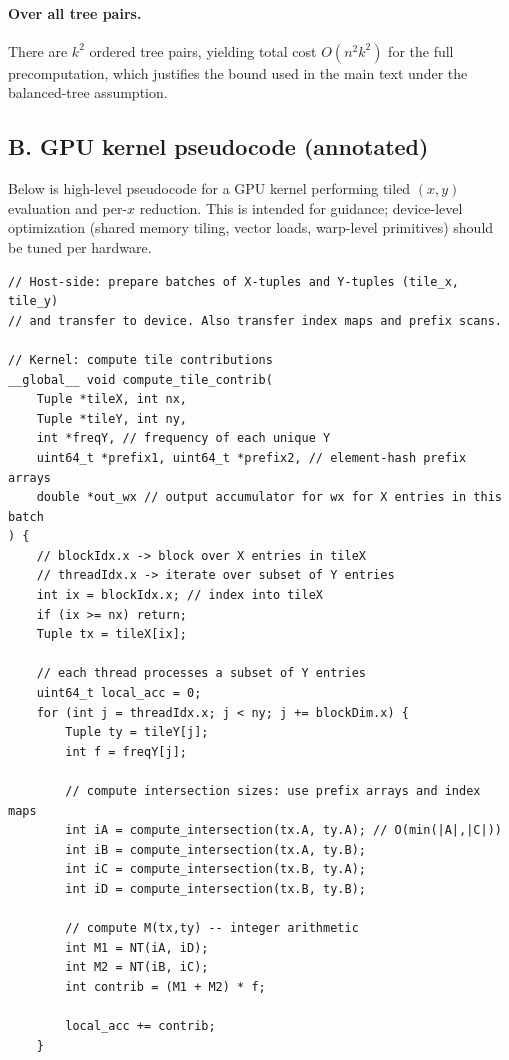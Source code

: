 \documentclass[10pt,a4paper]{article}
\begin{document}
\begin{enumerate}
\paragraph{Over all tree pairs.}
There are $k^2$ ordered tree pairs, yielding total cost $O(n^2 k^2)$ for the full precomputation, which justifies the bound used in the main text under the balanced-tree assumption.

\vspace{4mm}
\subsection*{B. GPU kernel pseudocode (annotated)}

Below is high-level pseudocode for a GPU kernel performing tiled $(x,y)$ evaluation and per-$x$ reduction. This is intended for guidance; device-level optimization (shared memory tiling, vector loads, warp-level primitives) should be tuned per hardware.

\begin{verbatim}
// Host-side: prepare batches of X-tuples and Y-tuples (tile_x, tile_y)
// and transfer to device. Also transfer index maps and prefix scans.

// Kernel: compute tile contributions
__global__ void compute_tile_contrib(
    Tuple *tileX, int nx,
    Tuple *tileY, int ny,
    int *freqY, // frequency of each unique Y
    uint64_t *prefix1, uint64_t *prefix2, // element-hash prefix arrays
    double *out_wx // output accumulator for wx for X entries in this batch
) {
    // blockIdx.x -> block over X entries in tileX
    // threadIdx.x -> iterate over subset of Y entries
    int ix = blockIdx.x; // index into tileX
    if (ix >= nx) return;
    Tuple tx = tileX[ix];

    // each thread processes a subset of Y entries
    uint64_t local_acc = 0;
    for (int j = threadIdx.x; j < ny; j += blockDim.x) {
        Tuple ty = tileY[j];
        int f = freqY[j];

        // compute intersection sizes: use prefix arrays and index maps
        int iA = compute_intersection(tx.A, ty.A); // O(min(|A|,|C|))
        int iB = compute_intersection(tx.A, ty.B);
        int iC = compute_intersection(tx.B, ty.A);
        int iD = compute_intersection(tx.B, ty.B);

        // compute M(tx,ty) -- integer arithmetic
        int M1 = NT(iA, iD);
        int M2 = NT(iB, iC);
        int contrib = (M1 + M2) * f;

        local_acc += contrib;
    }


\end{verbatim}
\end{enumerate}
\end{document}
